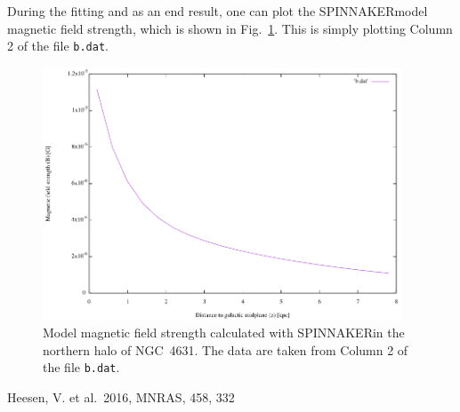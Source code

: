\documentclass[11pt,twocolumn,a4paper]{article}
\newcommand\spix{{\small SPINNAKER}}
\begin{document}
During the fitting and as an end result, one can plot the \spix model magnetic field strength, which is shown in Fig.~\ref{fig:b_profile}. This is simply plotting Column 2 of the file {\tt b.dat}.




\begin{figure}
  \centering
  \includegraphics[width=0.95\textwidth]{b_profile}
  \caption{Model magnetic field strength calculated with \spix in the northern halo of NGC~4631. The data are taken from Column 2 of the file {\tt b.dat}.}
\label{fig:b_profile}
\end{figure}


\begin{thebibliography}{99}
 Heesen, V. et al.\ 2016,
  MNRAS, 458, 332
\end{thebibliography}
\end{document}
